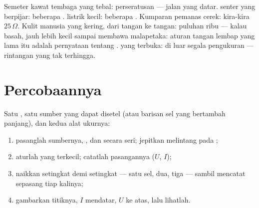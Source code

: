 \begin{example}\label{ex:g8:ohms-law:values}
Semeter kawat tembaga yang tebal: perseratusan  --- jalan yang
datar.  senter yang berpijar: beberapa .  listrik kecil:
beberapa . Kumparan pemanas cerek: kira-kira $25\,\Omega$. Kulit
manusia yang kering, dari tangan ke tangan: puluhan ribu  --- kalau
basah, jauh lebih kecil sampai membawa malapetaka: aturan tangan
lembap yang lama itu adalah pernyataan tentang .  yang
terbuka:  di luar segala pengukuran --- rintangan yang tak
terhingga.
\end{example}

\section{Percobaannya}

\begin{method}\label{met:g8:ohms-law:portrait}
Satu , satu sumber yang dapat disetel (atau barisan sel yang
bertambah panjang), dan kedua alat ukurnya:
\begin{enumerate}
  \item pasanglah sumbernya, , dan  secara
        seri; jepitkan  melintang pada ;
  \item aturlah  yang terkecil; catatlah pasangannya ($U$, $I$);
  \item naikkan  setingkat demi setingkat --- satu sel, dua,
        tiga --- sambil mencatat sepasang tiap kalinya;
  \item gambarkan titiknya, $I$ mendatar, $U$ ke atas, lalu lihatlah.
\end{enumerate}
\end{method}

